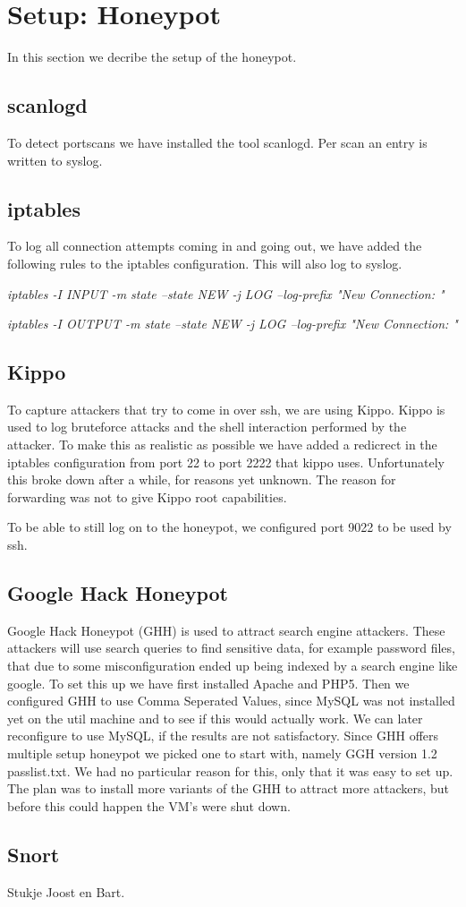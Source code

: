 \documentclass[11pt]{article} %
\begin{document}
\section{Setup: Honeypot}

In this section we decribe the setup of the honeypot.

\subsection{scanlogd}

To detect portscans we have installed the tool scanlogd.
Per scan an entry is written to syslog.

\subsection{iptables}
To log all connection attempts coming in and going out, we have added the following rules to the iptables configuration. 
This will also log to syslog.

\emph{iptables -I INPUT -m state --state NEW -j LOG --log-prefix "New Connection: "}

\emph{iptables -I OUTPUT -m state --state NEW -j LOG --log-prefix "New Connection: "}


\subsection{Kippo}
To capture attackers that try to come in over ssh, we are using Kippo. 
Kippo is used to log bruteforce attacks and the shell interaction performed by the attacker. 
To make this as realistic as possible we have added a redicrect in the iptables configuration from port 22 to port 2222 that kippo uses. 
Unfortunately this broke down after a while, for reasons yet unknown. 
The reason for forwarding was not to give Kippo root capabilities.

To be able to still log on to the honeypot, we configured port 9022 to be used by ssh.

\subsection{Google Hack Honeypot}
Google Hack Honeypot (GHH) is used to attract search engine attackers. 
These attackers will use search queries to find sensitive data, for example password files, that due to some misconfiguration ended up being indexed by a search engine like google.
To set this up we have first installed Apache and PHP5.
Then we configured GHH to use Comma Seperated Values, since MySQL was not installed yet on the util machine and to see if this would actually work. 
We can later reconfigure to use MySQL, if the results are not satisfactory.
Since GHH offers multiple setup honeypot we picked one to start with, namely GGH version 1.2 passlist.txt.
We had no particular reason for this, only that it was easy to set up. 
The plan was to install more variants of the GHH to attract more attackers, but before this could happen the VM's were shut down.


\subsection{Snort}

Stukje Joost en Bart.






\end{document}
